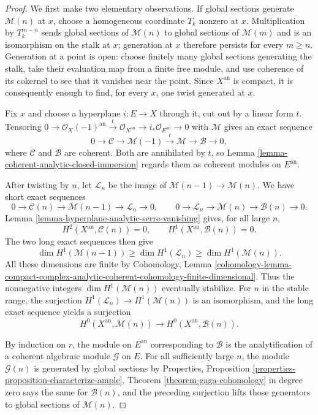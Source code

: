 \begin{proof}
We first make two elementary observations. If global sections generate
$\mathcal M(n)$ at $x$, choose a homogeneous coordinate $T_k$ nonzero at
$x$. Multiplication by $T_k^{m-n}$ sends global sections of $\mathcal M(n)$
to global sections of $\mathcal M(m)$ and is an isomorphism on the stalk at
$x$; generation at $x$ therefore persists for every $m\geq n$. Generation
at a point is open: choose finitely many global sections generating the
stalk, take their evaluation map from a finite free module, and use
coherence of its cokernel to see that it vanishes near the point. Since
$X^{\mathrm{an}}$ is compact, it is consequently enough to find, for every
$x$, one twist generated at $x$.

Fix $x$ and choose a hyperplane $i:E\to X$ through it, cut out by a linear
form $t$. Tensoring
$0\to\mathcal O_X(-1)^{\mathrm{an}}\xrightarrow{t}
\mathcal O_{X^{\mathrm{an}}}\to i_*\mathcal O_{E^{\mathrm{an}}}\to0$
with $\mathcal M$ gives an exact sequence
$$
0\longrightarrow\mathcal C\longrightarrow\mathcal M(-1)
\xrightarrow{t}\mathcal M\longrightarrow\mathcal B\longrightarrow0,
$$
where $\mathcal C$ and $\mathcal B$ are coherent. Both are annihilated by
$t$, so Lemma \ref{lemma-coherent-analytic-closed-immersion} regards them
as coherent modules on $E^{\mathrm{an}}$.

After twisting by $n$, let $\mathcal L_n$ be the image of
$\mathcal M(n-1)\to\mathcal M(n)$. We have short exact sequences
$$
0\to\mathcal C(n)\to\mathcal M(n-1)\to\mathcal L_n\to0,
\qquad
0\to\mathcal L_n\to\mathcal M(n)\to\mathcal B(n)\to0.
$$
Lemma \ref{lemma-hyperplane-analytic-serre-vanishing} gives, for all large
$n$,
$$
H^2(X^{\mathrm{an}},\mathcal C(n))=0,
\qquad
H^1(X^{\mathrm{an}},\mathcal B(n))=0.
$$
The two long exact sequences then give
$$
\dim H^1(\mathcal M(n-1))
\geq\dim H^1(\mathcal L_n)
\geq\dim H^1(\mathcal M(n)).
$$
All these dimensions are finite by Cohomology, Lemma
\ref{cohomology-lemma-compact-complex-analytic-coherent-cohomology-finite-dimensional}.
Thus the nonnegative integers $\dim H^1(\mathcal M(n))$ eventually
stabilize. For $n$ in the stable range, the surjection
$H^1(\mathcal L_n)\to H^1(\mathcal M(n))$ is an isomorphism, and the long
exact sequence yields a surjection
$$
H^0(X^{\mathrm{an}},\mathcal M(n))
\longrightarrow H^0(X^{\mathrm{an}},\mathcal B(n)).
$$

By induction on $r$, the module on $E^{\mathrm{an}}$ corresponding to
$\mathcal B$ is the analytification of a coherent algebraic module
$\mathcal G$ on $E$. For all sufficiently large $n$, the module
$\mathcal G(n)$ is generated by global sections by Properties, Proposition
\ref{properties-proposition-characterize-ample}. Theorem
\ref{theorem-gaga-cohomology} in degree zero says the same for
$\mathcal B(n)$, and the preceding surjection lifts those generators to
global sections of $\mathcal M(n)$.


\end{proof}
